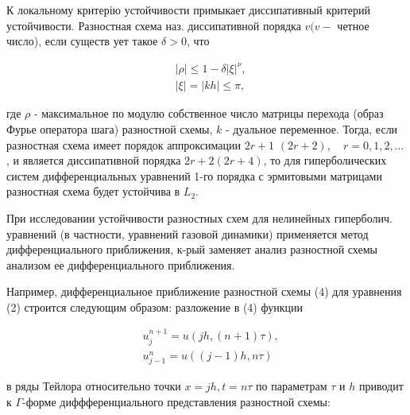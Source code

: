 \documentclass[10pt]{article}
\begin{document}
К локальному критерію устойчивости примыкает диссипативный критерий устойчивости. Разностная схема наз. диссипативной порядка $v(v-$ четное число), если существ ует такое $\delta>0$, что



\[

\begin{aligned}

& |\rho| \leqslant 1-\delta|\xi|^{\nu}, \\

& |\xi|=|k h| \leqslant \pi,

\end{aligned}

\]



где $\rho$ - максимальное по модулю собственное число матрицы перехода (образ Фурье оператора шага) разностной схемы, $k$ - дуальное переменное. Тогда, если разностная схема имеет порядок аппроксимации $2 r+1$ $(2 r+2), \quad r=0,1,2, \ldots$, и является диссипативной порядка $2 r+2(2 r+4)$, то для гиперболических систем дифференциальных уравнений 1-го порядка с эрмитовыми матрицами разностная схема будет устойчива в $L_{2}$.



При исследовании устойчивости разностных схем для нелинейных гиперболич. уравнений (в частности, уравнений газовой динамики) применяется метод дифференциального приближения, к-рый заменяет анализ разностной схемы анализом ее дифференциального приближения.



Например, дифференциальное приближение разностной схемы (4) для уравнения (2) строится следующим образом: разложение в (4) функции



\[

\begin{aligned}

& u_{j}^{n+1}=u(j h,(n+1) \tau), \\

& u_{j-1}^{n}=u((j-1) h, n \tau)

\end{aligned}

\]



в ряды Тейлора относительно точки $x=j h, t=n \tau$ по параметрам $\tau$ и $h$ приводит к $\Gamma$-форме диффференциального представления разностной схемы:
\end{document}
